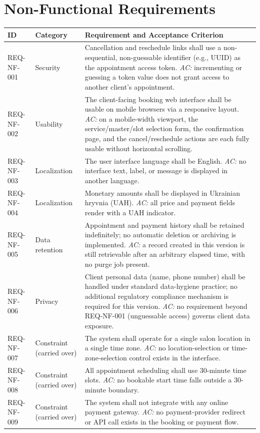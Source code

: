 \documentclass[11pt,a4paper]{article}
\begin{document}
\section{Non-Functional Requirements}
\label{sec:nonfunctional}

\begin{longtable}{L{1.9cm}L{2.6cm}L{9.9cm}}
\toprule
ID & Category & Requirement and Acceptance Criterion \\
\midrule
\endhead
REQ-NF-001 & Security & Cancellation and reschedule links shall use a
  non-sequential, non-guessable identifier (e.g., UUID) as the appointment
  access token. \emph{AC:} incrementing or guessing a token value does not
  grant access to another client's appointment. \\
REQ-NF-002 & Usability & The client-facing booking web interface shall be
  usable on mobile browsers via a responsive layout. \emph{AC:} on a
  mobile-width viewport, the service/master/slot selection form, the
  confirmation page, and the cancel/reschedule actions are each fully
  usable without horizontal scrolling. \\
REQ-NF-003 & Localization & The user interface language shall be English.
  \emph{AC:} no interface text, label, or message is displayed in another
  language. \\
REQ-NF-004 & Localization & Monetary amounts shall be displayed in
  Ukrainian hryvnia (UAH). \emph{AC:} all price and payment fields render
  with a UAH indicator. \\
REQ-NF-005 & Data retention & Appointment and payment history shall be
  retained indefinitely; no automatic deletion or archiving is implemented.
  \emph{AC:} a record created in this version is still retrievable after
  an arbitrary elapsed time, with no purge job present. \\
REQ-NF-006 & Privacy & Client personal data (name, phone number) shall be
  handled under standard data-hygiene practice; no additional regulatory
  compliance mechanism is required for this version. \emph{AC:} no
  requirement beyond REQ-NF-001 (unguessable access) governs client data
  exposure. \\
REQ-NF-007 & Constraint (carried over) & The system shall operate for a
  single salon location in a single time zone. \emph{AC:} no
  location-selection or time-zone-selection control exists in the
  interface. \\
REQ-NF-008 & Constraint (carried over) & All appointment scheduling shall
  use 30-minute time slots. \emph{AC:} no bookable start time falls outside
  a 30-minute boundary. \\
REQ-NF-009 & Constraint (carried over) & The system shall not integrate
  with any online payment gateway. \emph{AC:} no payment-provider redirect
  or API call exists in the booking or payment flow. \\
\bottomrule
\end{longtable}
\end{document}
